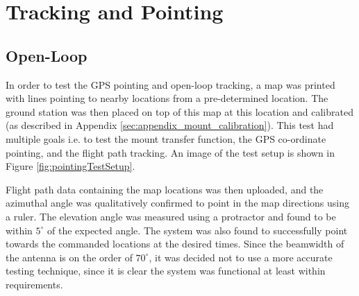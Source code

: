 \graphicspath{{./figures}}

\section{Tracking and Pointing}

\subsection{Open-Loop}

In order to test the GPS pointing and open-loop tracking, a map was printed with lines pointing to nearby locations from a pre-determined location. The ground station was then placed on top of this map at this location and calibrated (as described in Appendix \ref{sec:appendix_mount_calibration}). This test had multiple goals i.e. to test the mount transfer function, the GPS co-ordinate pointing, and the flight path tracking. An image of the test setup is shown in Figure \ref{fig:pointingTestSetup}.

Flight path data containing the map locations was then uploaded, and the azimuthal angle was qualitatively confirmed to point in the map directions using a ruler. The elevation angle was measured using a protractor and found to be within $5^\circ$ of the expected angle. The system was also found to successfully point towards the commanded locations at the desired times. Since the beamwidth of the antenna is on the order of $70^\circ$, it was decided not to use a more accurate testing technique, since it is clear the system was functional at least within requirements.

